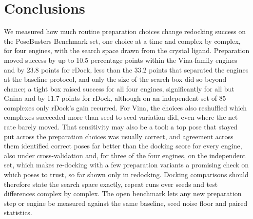 \section{Conclusions}
\label{sec:conclusions}

We measured how much routine preparation choices change redocking success on the
PoseBusters Benchmark set, one choice at a time and complex by complex, for four engines,
with the search space drawn from the crystal ligand.
Preparation moved success by up to 10.5 percentage points within the Vina-family engines
and by 23.8 points for rDock, less than the 33.2 points that separated the engines at the
baseline protocol, and only the size of the search box did so beyond chance; a tight box
raised success for all four engines, significantly for all but Gnina and by 11.7 points for
rDock, although on an independent set of 85 complexes only rDock's gain recurred. For Vina,
the choices also reshuffled which complexes succeeded more
than seed-to-seed variation did, even where the net rate barely moved. That sensitivity may
also be a tool: a top pose that stayed put across the preparation choices was usually
correct, and agreement across them identified correct poses far better than the docking
score for every engine, also under cross-validation and, for three of the four engines, on
the independent set, which makes re-docking with a few preparation variants a promising check
on which poses to trust, so far shown only in redocking. Docking comparisons
should therefore state the search space exactly, repeat runs over seeds and test
differences complex by complex. The open benchmark lets any new preparation step or engine
be measured against the same baseline, seed noise floor and paired statistics.
